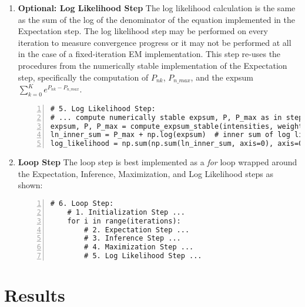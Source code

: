 \documentclass[conference]{IEEEtran}
\begin{document}
\begin{enumerate}
    \item \textbf{Optional: Log Likelihood Step} The log likelihood calculation is the same as the sum of the log of the denominator of the equation implemented in the Expectation step. The log likelihood step may be performed on every iteration to measure convergence progress or it may not be performed at all in the case of a fixed-iteration EM implementation. This step re-uses the procedures from the numerically stable implementation of the Expectation step, specifically the computation of $P_{nk}$, $P_{n\_max}$, and the expsum $\sum_{k=0}^{K}e^{P_{nk} - P_{n\_max}}$.
\begin{lstlisting}[style=mypython, numbers=left, stepnumber=1, breakatwhitespace=true]   
# 5. Log Likelihood Step:
# ... compute numerically stable expsum, P, P_max as in step 2b.
expsum, P, P_max = compute_expsum_stable(intensities, weights_list, means_list, stdevs_list)
ln_inner_sum = P_max + np.log(expsum)  # inner sum of log likelihood equation
log_likelihood = np.sum(np.sum(ln_inner_sum, axis=0), axis=0)  # outer sum of log likelihood equation
\end{lstlisting}
    
    \item \textbf{Loop Step} The loop step is best implemented as a \emph{for} loop wrapped around the Expectation, Inference, Maximization, and Log Likelihood steps as shown:
\begin{lstlisting}[style=mypython, numbers=left, stepnumber=1, breakatwhitespace=true]    
# 6. Loop Step:
    # 1. Initialization Step ...
    for i in range(iterations):
        # 2. Expectation Step ...
        # 3. Inference Step ...
        # 4. Maximization Step ...
        # 5. Log Likelihood Step ...
\end{lstlisting}

\end{enumerate}

\section{Results}
\end{document}
